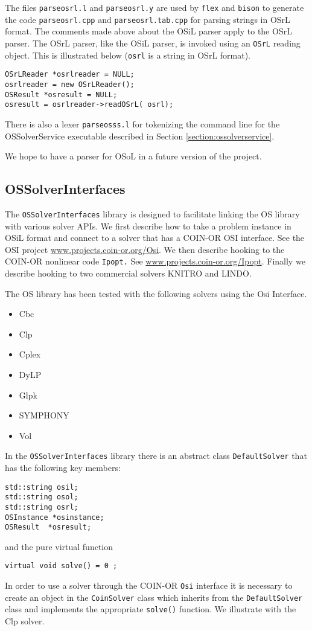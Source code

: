 \documentclass[11pt]{article}
\renewcommand{\_}{{\char"5F}}
\renewcommand{\{}{{\char"7B}}
\renewcommand{\}}{{\char"7D}}
\renewcommand{\^}{{\char"0D}}
\renewcommand{\'}{{\char"0D}}
\begin{document}
The files {\tt parseosrl.l} and {\tt parseosrl.y} are used by {\tt flex} and {\tt bison} to  generate the code {\tt parseosrl.cpp} and {\tt parseosrl.tab.cpp} for parsing strings in OSrL format. The comments made above about the OSiL parser apply to the OSrL parser. The OSrL parser, like the OSiL parser, is invoked using an {\tt OSrL} reading object. This is illustrated below ({\tt osrl} is a string in OSrL format).
\begin{verbatim}
OSrLReader *osrlreader = NULL;
osrlreader = new OSrLReader();
OSResult *osresult = NULL;
osresult = osrlreader->readOSrL( osrl);
\end{verbatim}

There is also a lexer {\tt parseosss.l} for tokenizing the command line for the OSSolverService executable described in Section \ref{section:ossolverservice}.

We hope to have a parser for OSoL  in a future version of the project.


\subsection{OSSolverInterfaces}\label{section:ossolverinterfaces}


The {\tt OSSolverInterfaces} library is designed to facilitate linking the OS library with various solver APIs. We first describe how to take a problem instance in OSiL format and connect to a solver that has a COIN-OR OSI interface.  See the OSI project \url{www.projects.coin-or.org/Osi}.   We then describe hooking to the COIN-OR nonlinear code {\tt Ipopt.} See \url{www.projects.coin-or.org/Ipopt}.  Finally we describe hooking to two commercial solvers KNITRO and LINDO.

The OS library has been tested with the following solvers using the Osi Interface.

\begin{itemize}
\item Cbc
\item Clp
\item Cplex
\item DyLP
\item Glpk
\item SYMPHONY
\item Vol
\end{itemize}

In the {\tt OSSolverInterfaces} library there is an abstract class {\tt DefaultSolver} that has the following key members:

\begin{verbatim}
std::string osil;
std::string osol;
std::string osrl;
OSInstance *osinstance;
OSResult  *osresult;
\end{verbatim}
and the pure virtual function
\begin{verbatim}
virtual void solve() = 0 ;	
\end{verbatim}
In order to use a solver through the COIN-OR {\tt Osi} interface it is necessary to create an object in the {\tt CoinSolver} class which inherits from the {\tt DefaultSolver} class and implements the appropriate {\tt solve()} function.  We illustrate with the Clp solver.
\end{document}
